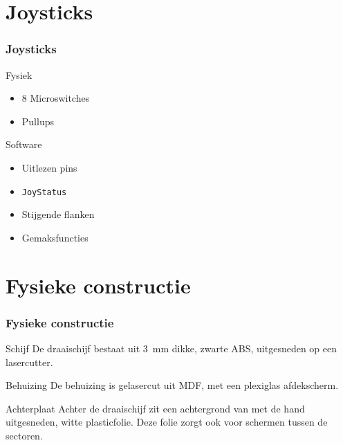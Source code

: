 \documentclass{beamer}
\begin{document}
\section{Joysticks}
\begin{frame}
  \frametitle{Joysticks}

  \begin{block}{Fysiek}
    \begin{itemize}
    \item 8 Microswitches
    \item Pullups
    \end{itemize}
  \end{block}

  \begin{block}{Software}
    \begin{itemize}
    \item Uitlezen pins
    \item \texttt{JoyStatus}
    \item Stijgende flanken
    \item Gemaksfuncties
    \end{itemize}
  \end{block}
\end{frame}

\section{Fysieke constructie}
\begin{frame}
  \frametitle{Fysieke constructie}

  \begin{block}{Schijf}
    De draaischijf bestaat uit \SI{3}{\milli\metre} dikke, zwarte ABS,
    uitgesneden op een lasercutter.
  \end{block}

  \begin{block}{Behuizing}
    De behuizing is gelasercut uit MDF, met een plexiglas afdekscherm.
  \end{block}

  \begin{block}{Achterplaat}
    Achter de draaischijf zit een achtergrond van met de hand uitgesneden, witte
    plasticfolie. Deze folie zorgt ook voor schermen tussen de sectoren.
  \end{block}
\end{frame}
\end{document}
